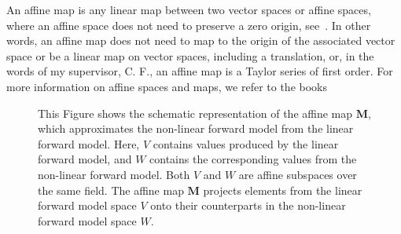 An affine map is any linear map between two vector spaces or affine spaces, where an affine space does not need to preserve a zero origin, see~\cite[Def. 2.3.1]{berger2009geometry}.
In other words, an affine map does not need to map to the origin of the associated vector space or be a linear map on vector spaces, including a translation, or, in the words of my supervisor, C. F., an affine map is a Taylor series of first order.
For more information on affine spaces and maps, we refer to the books \cite{berger2009geometry, katsumi1994affine}
\begin{figure}[ht!]
	\centering
	\caption[Schematics of the affine map]{This Figure shows the schematic representation of the affine map $\bm{M}$, which approximates the non-linear forward model from the linear forward model. Here, $V$ contains values produced by the linear forward model, and $W$ contains the corresponding values from the non-linear forward model. Both $V$ and $W$ are affine subspaces over the same field. The affine map $\bm{M}$ projects elements from the linear forward model space $V$ onto their counterparts in the non-linear forward model space $W$.
	}
\end{figure}



